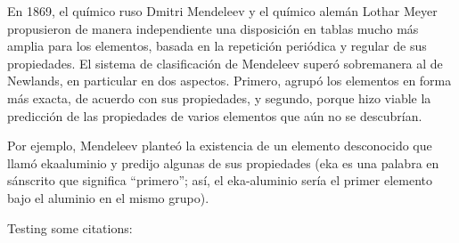 \documentclass[spanish]{article}
\begin{document}
En 1869, el químico ruso Dmitri Mendeleev y el químico alemán Lothar Meyer propusieron de manera independiente una disposición en tablas mucho más amplia para los elementos, basada en la  repetición periódica y regular de sus propiedades. El sistema de clasificación de Mendeleev superó sobremanera al de Newlands, en particular en dos aspectos. Primero, agrupó los elementos en forma más exacta, de acuerdo con sus propiedades, y segundo, porque hizo viable la predicción de las propiedades de varios elementos que aún no se descubrían.

Por ejemplo, Mendeleev planteó la existencia de un elemento desconocido que llamó ekaaluminio y predijo algunas de sus propiedades (eka es una palabra en sánscrito que significa
“primero”; así, el eka-aluminio sería el primer elemento bajo el aluminio en el mismo grupo).



Testing some citations: \cite{Lim2016TEI}




\end{document}
